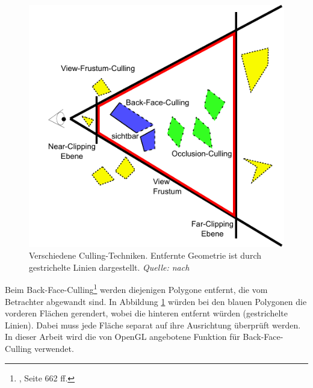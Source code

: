 \begin{figure}
  \centering
  \includegraphics[scale=0.8]{images/culling.pdf}
  \caption{Verschiedene Culling-Techniken. Entfernte Geometrie ist durch gestrichelte Linien dargestellt. \textit{Quelle: nach \cite{culling}} }
  \label{fig:basics:culling}
\end{figure}
Beim Back-Face-Culling\footnote{\cite{RTR3}, Seite 662 ff.} werden diejenigen Polygone entfernt, die vom Betrachter abgewandt sind. In Abbildung \ref{fig:basics:culling} würden bei den blauen Polygonen die vorderen Flächen gerendert, wobei die hinteren entfernt würden (gestrichelte Linien). Dabei muss jede Fläche separat auf ihre Ausrichtung überprüft werden. In dieser Arbeit wird die von OpenGL angebotene Funktion für Back-Face-Culling verwendet.\\
